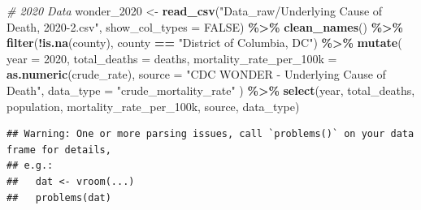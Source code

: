 \documentclass[
]{article}
\newenvironment{Shaded}{\begin{snugshade}}{\end{snugshade}}
\newcommand{\AttributeTok}[1]{\textcolor[rgb]{0.13,0.29,0.53}{#1}}
\newcommand{\CommentTok}[1]{\textcolor[rgb]{0.56,0.35,0.01}{\textit{#1}}}
\newcommand{\ConstantTok}[1]{\textcolor[rgb]{0.56,0.35,0.01}{#1}}
\newcommand{\DecValTok}[1]{\textcolor[rgb]{0.00,0.00,0.81}{#1}}
\newcommand{\FunctionTok}[1]{\textcolor[rgb]{0.13,0.29,0.53}{\textbf{#1}}}
\newcommand{\NormalTok}[1]{#1}
\newcommand{\OtherTok}[1]{\textcolor[rgb]{0.56,0.35,0.01}{#1}}
\newcommand{\SpecialCharTok}[1]{\textcolor[rgb]{0.81,0.36,0.00}{\textbf{#1}}}
\newcommand{\StringTok}[1]{\textcolor[rgb]{0.31,0.60,0.02}{#1}}
\begin{document}
\begin{Shaded}
\begin{Highlighting}[]
\CommentTok{\# 2020 Data}
\NormalTok{wonder\_2020 }\OtherTok{\textless{}{-}} \FunctionTok{read\_csv}\NormalTok{(}\StringTok{"Data\_raw/Underlying Cause of Death, 2020{-}2.csv"}\NormalTok{, }\AttributeTok{show\_col\_types =} \ConstantTok{FALSE}\NormalTok{) }\SpecialCharTok{\%\textgreater{}\%}
  \FunctionTok{clean\_names}\NormalTok{() }\SpecialCharTok{\%\textgreater{}\%}
  \FunctionTok{filter}\NormalTok{(}\SpecialCharTok{!}\FunctionTok{is.na}\NormalTok{(county), county }\SpecialCharTok{==} \StringTok{"District of Columbia, DC"}\NormalTok{) }\SpecialCharTok{\%\textgreater{}\%}
  \FunctionTok{mutate}\NormalTok{(}
    \AttributeTok{year =} \DecValTok{2020}\NormalTok{,}
    \AttributeTok{total\_deaths =}\NormalTok{ deaths,}
    \AttributeTok{mortality\_rate\_per\_100k =} \FunctionTok{as.numeric}\NormalTok{(crude\_rate),}
    \AttributeTok{source =} \StringTok{"CDC WONDER {-} Underlying Cause of Death"}\NormalTok{,}
    \AttributeTok{data\_type =} \StringTok{"crude\_mortality\_rate"}
\NormalTok{  ) }\SpecialCharTok{\%\textgreater{}\%}
  \FunctionTok{select}\NormalTok{(year, total\_deaths, population, mortality\_rate\_per\_100k, source, data\_type)}
\end{Highlighting}
\end{Shaded}

\begin{verbatim}
## Warning: One or more parsing issues, call `problems()` on your data frame for details,
## e.g.:
##   dat <- vroom(...)
##   problems(dat)
\end{verbatim}
\end{document}

